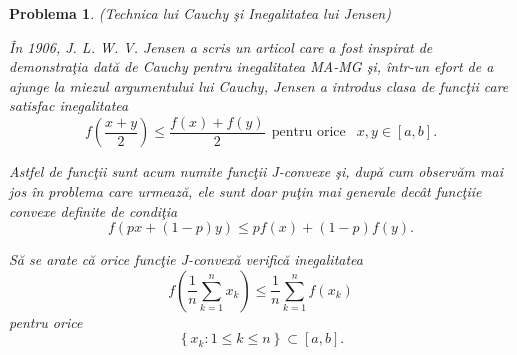 \documentclass[a4paper,12pt,oneside]{report}
\newtheorem{problem}{Problema}
\begin{document}
\begin{problem} (Technica lui Cauchy \c{s}i Inegalitatea lui Jensen)

\^{I}n 1906, J. L. W. V. Jensen a scris un articol care a fost inspirat de demonstra\c{t}ia dat\u{a} de Cauchy pentru inegalitatea MA-MG \c{s}i, \^{i}ntr-un efort de a ajunge la miezul argumentului lui Cauchy, Jensen a introdus clasa de func\c{t}ii care satisfac inegalitatea
\begin{displaymath}
  f\left ( \frac{x + y}{2} \right ) \leq \frac{f\left ( x \right ) + f\left ( y \right )}{2} ~~ \text{pentru orice } ~~  x,y \in \left [ a, b \right ]. \label{eq:2.14} \tag{2.14}
\end{displaymath}

Astfel de func\c{t}ii sunt acum numite func\c{t}ii J-convexe \c{s}i, dup\u{a} cum observ\u{a}m mai jos \^{i}n problema care urmeaz\u{a}, ele sunt doar pu\c{t}in mai generale dec\^{a}t func\c{t}iie convexe definite de condi\c{t}ia
\begin{displaymath}
  f\left ( px + \left ( 1 - p \right )y \right )\leq pf\left ( x \right ) + \left ( 1-p \right )f\left ( y \right ).
\end{displaymath}

S\u{a} se arate c\u{a} orice func\c{t}ie  J-convex\u{a} verific\u{a} inegalitatea
\begin{displaymath}
  f\left ( \frac{1}{n} \sum_{k = 1}^{n}x_{k}\right )\leq \frac{1}{n}\sum_{k = 1}^{n}f\left ( x_{k} \right )
\end{displaymath}
pentru orice
\begin{displaymath}
  \left \{ x_{k}: 1\leq k \leq n \right \} \subset \left [ a, b \right ]. \label{eq:2.15} \tag{2.15}
\end{displaymath}
\end{problem}
\end{document}
